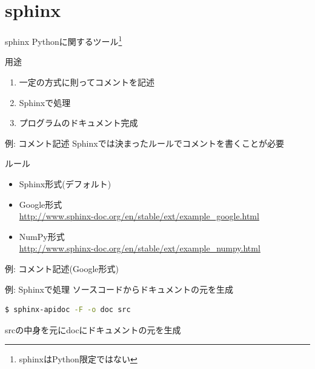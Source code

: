 \documentclass[12pt, xetex, xcolor=pdftex, dvipsnames]{beamer}
\begin{document}
\section{sphinx}
\begin{frame}{sphinx}
    Pythonに関するツール\footnote{sphinxはPython限定ではない}
\end{frame}
\begin{frame}{用途}
    \begin{enumerate}
        \item 一定の方式に則ってコメントを記述
        \item Sphinxで処理
        \item プログラムのドキュメント完成
    \end{enumerate}
\end{frame}
\begin{frame}{例: コメント記述}
    Sphinxでは決まったルールでコメントを書くことが必要

    \begin{block}{ルール}
        \begin{itemize}
            \item Sphinx形式(デフォルト)
            \item Google形式\\
                \url{http://www.sphinx-doc.org/en/stable/ext/example_google.html}
            \item NumPy形式\\
                \url{http://www.sphinx-doc.org/en/stable/ext/example_numpy.html}
        \end{itemize}
    \end{block}
\end{frame}
\begin{frame}[fragile]{例: コメント記述(Google形式)}
    
\end{frame}
\begin{frame}[fragile]{例: Sphinxで処理}
    ソースコードからドキュメントの元を生成

    \begin{lstlisting}[language=Bash]
$ sphinx-apidoc -F -o doc src
    \end{lstlisting}

    srcの中身を元にdocにドキュメントの元を生成
\end{frame}
\end{document}
